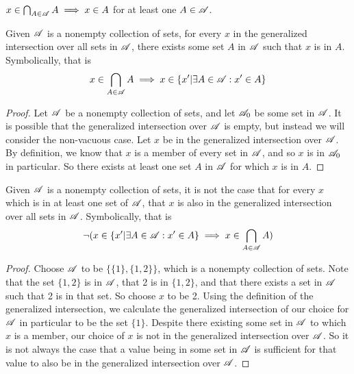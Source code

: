 \documentclass[main.tex]{subfiles}
\begin{document}
\subproblem{}\label{5c}

\(x \in \bigcap_{A \in \mathscr{A}} {A} \implies x \in A\) for
at least one \(A \in \mathscr{A}\).

\begin{thm}
	Given \(\mathscr{A}\) is a nonempty collection of sets, for every \(x\)
	in the generalized intersection over all sets in \(\mathscr{A}\), there
	exists some set \(A\) in \(\mathscr{A}\) such that \(x\) is in \(A\).
	Symbolically, that is
	\[x \in \bigcap\limits_{A \in \mathscr{A}} {A} \implies x \in \{x'|\exists A \in \mathscr{A} : x' \in A\}\]
\end{thm}
\begin{proof}
	Let \(\mathscr{A}\) be a nonempty collection of sets, and let
	\(\mathscr{A}_0\) be some set in \(\mathscr{A}\). It is possible
	that the generalized intersection over \(\mathscr{A}\) is empty, but
	instead we will consider the non-vacuous case. Let \(x\) be in the
	generalized intersection over \(\mathscr{A}\). By definition, we know
	that \(x\) is a member of every set in \(\mathscr{A}\), and so \(x\) is
	in \(\mathscr{A}_0\) in particular. So there exists at least one set
	\(A\) in \(\mathscr{A}\) for which \(x\) is in \(A\).
\end{proof}

\begin{thm}
	Given \(\mathscr{A}\) is a nonempty collection of sets, it is not the
	case that for every \(x\) which is in at least one set of
	\(\mathscr{A}\), that \(x\) is also in the generalized intersection over
	all sets in \(\mathscr{A}\). Symbolically, that is
	\[\neg{} (x \in \{x'|\exists A \in \mathscr{A} : x' \in A\} \implies x \in \bigcap\limits_{A \in \mathscr{A}} {A})\]
\end{thm}
\begin{proof}
	Choose \(\mathscr{A}\) to be \(\{\{1\},\{1,2\}\}\), which is a nonempty
	collection of sets. Note that the set \(\{1,2\}\) is in \(\mathscr{A}\),
	that 2 is in \(\{1,2\}\), and that there exists a set in \(\mathscr{A}\)
	such that 2 is in that set. So choose \(x\) to be 2. Using the
	definition of the generalized intersection, we calculate the generalized
	intersection of our choice for \(\mathscr{A}\) in particular to be the
	set \(\{1\}\). Despite there existing some set in \(\mathscr{A}\) to
	which \(x\) is a member, our choice of \(x\) is not in the generalized
	intersection over \(\mathscr{A}\). So it is not always the case that a
	value being in some set in \(\mathscr{A}\) is sufficient for that value
	to also be in the generalized intersection over \(\mathscr{A}\).
\end{proof}
\end{document}
